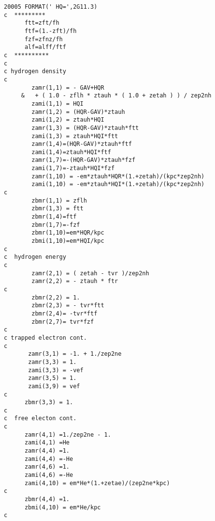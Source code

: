 \begin{verbatim}
20005 FORMAT(' HQ=',2G11.3)
c  *********
      ftt=zft/fh
      ftf=(1.-zft)/fh
      fzf=zfnz/fh
      alf=alff/ftf
c  **********
c
c hydrogen density
c
        zamr(1,1) = - GAV+HQR
     &   + ( 1.0 - zflh * ztauh * ( 1.0 + zetah ) ) / zep2nh
        zami(1,1) = HQI
        zamr(1,2) = (HQR-GAV)*ztauh
        zami(1,2) = ztauh*HQI
        zamr(1,3) = (HQR-GAV)*ztauh*ftt
        zami(1,3) = ztauh*HQI*ftt
        zamr(1,4)=(HQR-GAV)*ztauh*ftf
        zami(1,4)=ztauh*HQI*ftf
        zamr(1,7)=-(HQR-GAV)*ztauh*fzf
        zami(1,7)=-ztauh*HQI*fzf
        zamr(1,10) = -em*ztauh*HQR*(1.+zetah)/(kpc*zep2nh)
        zami(1,10) = -em*ztauh*HQI*(1.+zetah)/(kpc*zep2nh)
c
        zbmr(1,1) = zflh
        zbmr(1,3) = ftt
        zbmr(1,4)=ftf
        zbmr(1,7)=-fzf
        zbmr(1,10)=em*HQR/kpc
        zbmi(1,10)=em*HQI/kpc
c
c  hydrogen energy
c
        zamr(2,1) = ( zetah - tvr )/zep2nh
        zamr(2,2) = - ztauh * ftr
c
        zbmr(2,2) = 1.
        zbmr(2,3) = - tvr*ftt
        zbmr(2,4)= -tvr*ftf
        zbmr(2,7)= tvr*fzf
c
c trapped electron cont.
c
       zamr(3,1) = -1. + 1./zep2ne
       zamr(3,3) = 1.
       zami(3,3) = -vef
       zamr(3,5) = 1.
       zami(3,9) = vef
c
      zbmr(3,3) = 1.
c
c  free electon cont.
c
      zamr(4,1) =1./zep2ne - 1.
      zami(4,1) =He
      zamr(4,4) =1.
      zami(4,4) =-He
      zamr(4,6) =1.
      zami(4,6) =-He
      zami(4,10) = em*He*(1.+zetae)/(zep2ne*kpc)
c
      zbmr(4,4) =1.
      zbmi(4,10) = em*He/kpc
c


\end{verbatim}
